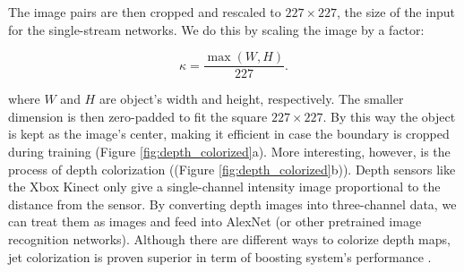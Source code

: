 The image pairs are then cropped and rescaled to $227 \times 227$, the size of the input for the single-stream networks. We do this by scaling the image by a factor:

\begin{equation}
	\label{equ:rescale}
	\kappa = \frac{\max(W, H)}{227}.
\end{equation}

where $W$ and $H$ are object's width and height, respectively. The smaller dimension is then zero-padded to fit the square $227 \times 227$. By this way the object is kept as the image's center, making it efficient in case the boundary is cropped during training (Figure \ref{fig:depth_colorized}a). More interesting, however, is the process of depth colorization ((Figure \ref{fig:depth_colorized}b)). Depth sensors like the Xbox Kinect only give a single-channel intensity image proportional to the distance from the sensor. By converting depth images into three-channel data, we can treat them as images and feed into AlexNet (or other pretrained image recognition networks). Although there are different ways to colorize depth maps, jet colorization is proven superior in term of boosting system's performance \cite{Eitel2015}.

